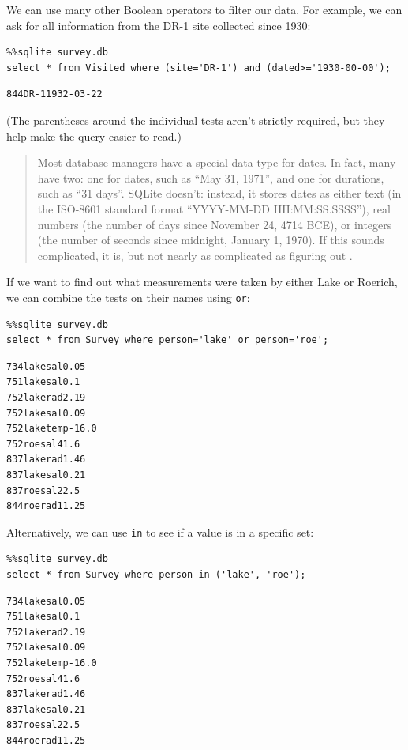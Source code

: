 \documentclass{book}
\begin{document}
We can use many other Boolean operators to filter our data. For example,
we can ask for all information from the DR-1 site collected since 1930:

\begin{verbatim}
%%sqlite survey.db
select * from Visited where (site='DR-1') and (dated>='1930-00-00');
\end{verbatim}

\begin{verbatim}
844DR-11932-03-22
\end{verbatim}

(The parentheses around the individual tests aren't strictly required,
but they help make the query easier to read.)

\begin{quote}
Most database managers have a special data type for dates. In fact, many
have two: one for dates, such as ``May 31, 1971'', and one for
durations, such as ``31 days''. SQLite doesn't: instead, it stores dates
as either text (in the ISO-8601 standard format ``YYYY-MM-DD
HH:MM:SS.SSSS''), real numbers (the number of days since November 24,
4714 BCE), or integers (the number of seconds since midnight, January 1,
1970). If this sounds complicated, it is, but not nearly as complicated
as figuring out
.
\end{quote}

If we want to find out what measurements were taken by either Lake or
Roerich, we can combine the tests on their names using \texttt{or}:

\begin{verbatim}
%%sqlite survey.db
select * from Survey where person='lake' or person='roe';
\end{verbatim}

\begin{verbatim}
734lakesal0.05
751lakesal0.1
752lakerad2.19
752lakesal0.09
752laketemp-16.0
752roesal41.6
837lakerad1.46
837lakesal0.21
837roesal22.5
844roerad11.25
\end{verbatim}

Alternatively, we can use \texttt{in} to see if a value is in a specific
set:

\begin{verbatim}
%%sqlite survey.db
select * from Survey where person in ('lake', 'roe');
\end{verbatim}

\begin{verbatim}
734lakesal0.05
751lakesal0.1
752lakerad2.19
752lakesal0.09
752laketemp-16.0
752roesal41.6
837lakerad1.46
837lakesal0.21
837roesal22.5
844roerad11.25
\end{verbatim}
\end{document}
